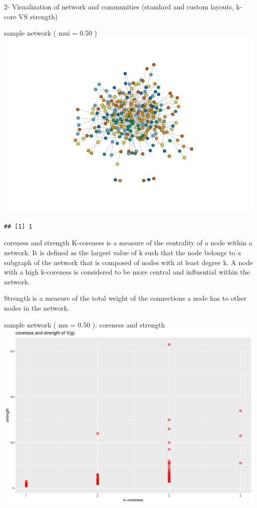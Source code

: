 \documentclass[
  ignorenonframetext,
]{beamer}
\begin{document}
\begin{frame}[fragile]{2- Visualization of network and communities
(standard and custom layouts, k-core VS strength)}
\begin{block}{sample network ( mui = 0.50 )}
\includegraphics{presentation1_files/figure-beamer/unnamed-chunk-10-1.pdf}

\begin{verbatim}
## [1] 1
\end{verbatim}
\end{block}

\begin{block}{coreness and strength}
\protect\hypertarget{coreness-and-strength}{}
K-coreness is a measure of the centrality of a node within a network. It
is defined as the largest value of k such that the node belongs to a
subgraph of the network that is composed of nodes with at least degree
k. A node with a high k-coreness is considered to be more central and
influential within the network.

Strength is a measure of the total weight of the connections a node has
to other nodes in the network.
\end{block}

\begin{block}{sample network ( mu = 0.50 ): coreness and strength}
\protect\hypertarget{sample-network-mu-0.50-coreness-and-strength}{}
\includegraphics{presentation1_files/figure-beamer/unnamed-chunk-11-1.pdf}
\end{block}


\end{frame}
\end{document}
